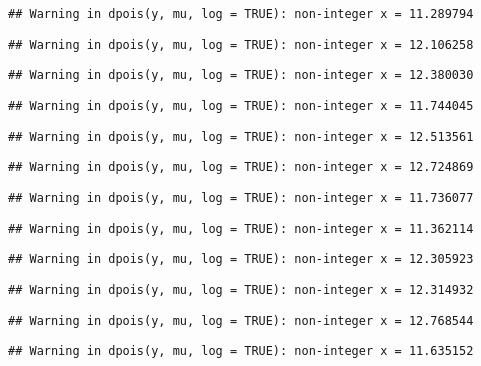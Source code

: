 \documentclass[
]{article}
\begin{document}
\begin{verbatim}
## Warning in dpois(y, mu, log = TRUE): non-integer x = 11.289794
\end{verbatim}

\begin{verbatim}
## Warning in dpois(y, mu, log = TRUE): non-integer x = 12.106258
\end{verbatim}

\begin{verbatim}
## Warning in dpois(y, mu, log = TRUE): non-integer x = 12.380030
\end{verbatim}

\begin{verbatim}
## Warning in dpois(y, mu, log = TRUE): non-integer x = 11.744045
\end{verbatim}

\begin{verbatim}
## Warning in dpois(y, mu, log = TRUE): non-integer x = 12.513561
\end{verbatim}

\begin{verbatim}
## Warning in dpois(y, mu, log = TRUE): non-integer x = 12.724869
\end{verbatim}

\begin{verbatim}
## Warning in dpois(y, mu, log = TRUE): non-integer x = 11.736077
\end{verbatim}

\begin{verbatim}
## Warning in dpois(y, mu, log = TRUE): non-integer x = 11.362114
\end{verbatim}

\begin{verbatim}
## Warning in dpois(y, mu, log = TRUE): non-integer x = 12.305923
\end{verbatim}

\begin{verbatim}
## Warning in dpois(y, mu, log = TRUE): non-integer x = 12.314932
\end{verbatim}

\begin{verbatim}
## Warning in dpois(y, mu, log = TRUE): non-integer x = 12.768544
\end{verbatim}

\begin{verbatim}
## Warning in dpois(y, mu, log = TRUE): non-integer x = 11.635152
\end{verbatim}
\end{document}
